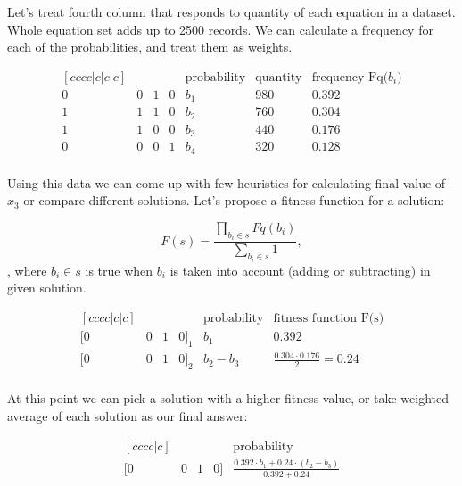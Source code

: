 Let's treat fourth column that responds to quantity of each equation in a dataset.
Whole equation set adds up to 2500 records.
We can calculate a frequency for each of the probabilities, and treat them as weights.

\begin{equation}
\begin{matrix}[cccc|c|c|c]
     &  &  &  & \mbox{probability} & \mbox{quantity} & \mbox{frequency Fq($b_i$)} \\
    \hline
    0 & 0 & 1 & 0 & b_1 & 980 & 0.392 \\
    1 & 1 & 1 & 0 & b_2 & 760 & 0.304 \\ 
    1 & 1 & 0 & 0 & b_3 & 440 & 0.176 \\ 
    0 & 0 & 0 & 1 & b_4 & 320 & 0.128 \\ 
\end{matrix}
\end{equation}

Using this data we can come up with few heuristics for calculating final value of $x_3$ or compare different solutions.
Let's propose a fitness function for a solution:

\begin{equation}
    F(s) = \frac{\displaystyle\prod_{b_{i} \in s} Fq(b_i)}{ \displaystyle\sum_{b_i \in s}1},
\end{equation},
where $b_i \in s$ is true when $b_i$ is taken into account (adding or subtracting) in given solution.

\begin{equation}
\begin{matrix}[cccc|c|c]
     &  &  &  & \mbox{probability} & \mbox{fitness function F(s)} \\
    \hline
    [0 & 0 & 1 & 0]_1 & b_1 & 0.392 \\
    [0 & 0 & 1 & 0]_2 & b_2 - b_3 & \frac{0.304 \cdot 0.176}{2} = 0.24 \\ 
\end{matrix}
\end{equation}

At this point we can pick a solution with a higher fitness value, or take weighted average of each solution as our final answer:

\begin{equation}
\begin{matrix}[cccc|c]
     &  &  &  & \mbox{probability}\\
    \hline
    [0 & 0 & 1 & 0] & \frac{0.392 \cdot b_1 + 0.24 \cdot (b_2 - b_3)}{0.392+0.24}\\
\end{matrix}
\end{equation}

